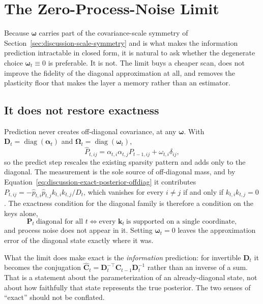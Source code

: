 \documentclass[11pt]{article}
\newcommand{\vct}[1]{\boldsymbol{#1}}
\newcommand{\diag}{\operatorname{diag}}
\begin{document}
\section{The Zero-Process-Noise Limit}
\label{sec:discussion-zero-process-noise}

Because $\vct{\omega}$ carries part of the covariance-scale symmetry of
Section~\ref{sec:discussion-scale-symmetry} and is what makes the information prediction
intractable in closed form, it is natural to ask whether the degenerate choice
$\vct{\omega}_t\equiv0$ is preferable. It is not. The limit buys a cheaper scan, does not improve
the fidelity of the diagonal approximation at all, and removes the plasticity floor that makes
the layer a memory rather than an estimator.

\subsection{It does not restore exactness}

Prediction never creates off-diagonal covariance, at any $\vct{\omega}$. With
$\vct{D}_t=\diag(\vct{\alpha}_t)$ and $\vct{\Omega}_t=\diag(\vct{\omega}_t)$,
\begin{equation}
  \widehat P_{t,ij}
  = \alpha_{t,i}\alpha_{t,j}P_{t-1,ij}
    +\omega_{t,i}\delta_{ij},
  \label{eq:discussion-predict-preserves-pattern}
\end{equation}
so the predict step rescales the existing sparsity pattern and adds only to the diagonal. The
measurement is the sole source of off-diagonal mass, and by
Equation~\eqref{eq:discussion-exact-posterior-offdiag} it contributes
$P_{t,ij}=-\widehat p_{t,i}\widehat p_{t,j}k_{t,i}k_{t,j}/D_t$, which vanishes for every
$i\ne j$ if and only if $k_{t,i}k_{t,j}=0$. The exactness condition for the diagonal family is
therefore a condition on the keys alone,
\begin{equation}
  \vct{P}_t\ \text{diagonal for all }t
  \iff
  \text{every }\vct{k}_t\ \text{is supported on a single coordinate},
  \label{eq:discussion-diagonal-exactness-condition}
\end{equation}
and process noise does not appear in it. Setting $\vct{\omega}_t=0$ leaves the approximation
error of the diagonal state exactly where it was.

What the limit does make exact is the \emph{information} prediction: for invertible
$\vct{D}_t$ it becomes the conjugation
$\widehat{\vct{C}}_t=\vct{D}_t^{-\top}\vct{C}_{t-1}\vct{D}_t^{-1}$ rather than an inverse of a
sum. That is a statement about the parameterization of an already-diagonal state, not about how
faithfully that state represents the true posterior. The two senses of ``exact'' should not be
conflated.
\end{document}
